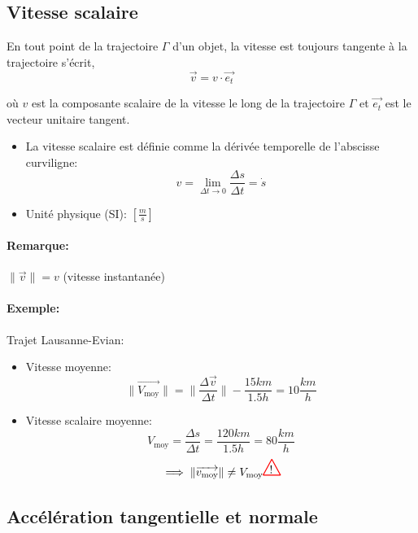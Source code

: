 \documentclass[
    11pt,
    a4paper,
    oneside,
    headinlcude, footinclude,
    twoside,
]{report}
\renewcommand{\vec}[1]{\overrightarrow{#1}}
\newcommand\Warning{
    \makebox[1.4em][c]{
    \makebox[-5.5pt][c]{\raisebox{.2em}{!}}
    \makebox[0pt][c]{\color{red}\huge$\bigtriangleup$}}
}
\begin{document}
\subsection{Vitesse scalaire}
\label{sub:vitesse_scalaire}

En tout point de la trajectoire $\Gamma$ d'un objet, la vitesse est toujours
tangente  à la trajectoire s'écrit,
$$\vec v = v \cdot \vec{e_{t}}$$

où $v$ est la composante scalaire de la vitesse le long de la trajectoire $\Gamma$
et $\vec{e_{t}}$ est le vecteur unitaire tangent.

\begin{itemize}
    \item La vitesse scalaire est définie comme la dérivée temporelle de
        l'abscisse curviligne:
        \begin{equation}
            \label{eq:3.50}
            v = \lim_{\Delta t \to 0} \frac{\Delta s}{\Delta t} = \dot s
        \end{equation}
    \item Unité physique (SI): $\left[\frac{m}{s}\right]$
\end{itemize}

\paragraph{Remarque:}

$\| \vec v \| = v$  (vitesse instantanée)
\paragraph{Exemple:}

Trajet Lausanne-Evian:

\begin{itemize}
    \item Vitesse moyenne:
        $$\|\vec{V_{\text{moy}}}\| = \|\frac{\Delta \vec v}{\Delta t}\| - \frac{15
        km}{1.5 h} = 10 \frac{km}{h}$$

    \item Vitesse scalaire moyenne:
        $$V_{\text{moy}} = \frac{\Delta s}{\Delta t} = \frac{120 km}{1.5h} = 80
        \frac{km}{h}$$
        $$\implies \| \vec{v_{\text{moy}}}\| \neq V_{\text{moy}} \Warning$$
\end{itemize}


\subsection{Accélération tangentielle et normale}
\end{document}
